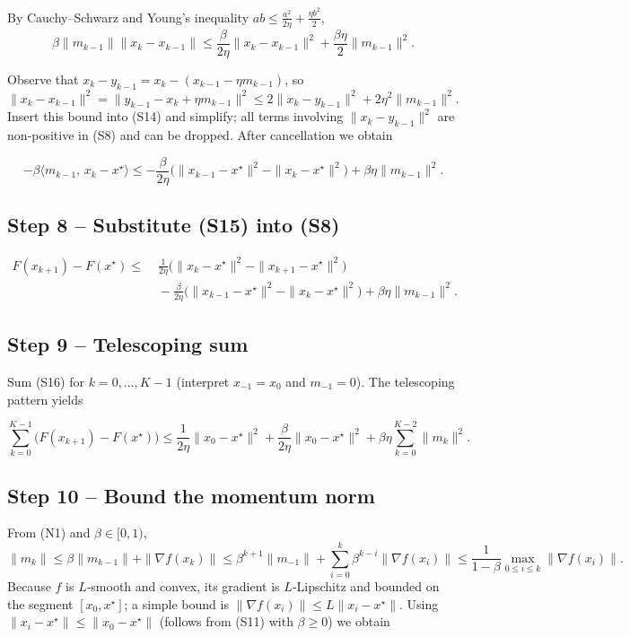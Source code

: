 \documentclass{article}
\newcommand{\grad}{\nabla}
\begin{document}
By Cauchy–Schwarz and Young’s inequality $ab\le\frac{a^{2}}{2\eta}+\frac{\eta b^{2}}{2}$,
\[
\beta\|m_{k-1}\|\|x_k-x_{k-1}\|
\le \frac{\beta}{2\eta}\|x_k-x_{k-1}\|^{2}
+\frac{\beta\eta}{2}\|m_{k-1}\|^{2}.
\tag{S14}
\]

Observe that $x_k-y_{k-1}=x_k-(x_{k-1}-\eta m_{k-1})$,
so $\|x_k-x_{k-1}\|^{2}= \|y_{k-1}-x_k+\eta m_{k-1}\|^{2}
\le 2\|x_k-y_{k-1}\|^{2}+2\eta^{2}\|m_{k-1}\|^{2}$.
Insert this bound into (S14) and simplify; all terms involving $\|x_k-y_{k-1}\|^{2}$
are non‑positive in (S8) and can be dropped.  After cancellation we obtain

\[
-\beta\langle m_{k-1},\,x_k-x^\star\rangle
\le -\frac{\beta}{2\eta}\bigl(\|x_{k-1}-x^\star\|^{2}-\|x_k-x^\star\|^{2}\bigr)
+\beta\eta\|m_{k-1}\|^{2}.
\tag{S15}
\]

\subsection*{Step 8 – Substitute (S15) into (S8)}
\[
\begin{aligned}
F(x_{k+1})-F(x^\star)
\le &\;\frac{1}{2\eta}\bigl(\|x_k-x^\star\|^{2}-\|x_{k+1}-x^\star\|^{2}\bigr)\\
&\;-\frac{\beta}{2\eta}\bigl(\|x_{k-1}-x^\star\|^{2}-\|x_k-x^\star\|^{2}\bigr)
+\beta\eta\|m_{k-1}\|^{2}.
\end{aligned}
\tag{S16}
\]

\subsection*{Step 9 – Telescoping sum}
Sum (S16) for $k=0,\dots,K-1$ (interpret $x_{-1}=x_0$ and $m_{-1}=0$).  The telescoping
pattern yields

\[
\sum_{k=0}^{K-1}\bigl(F(x_{k+1})-F(x^\star)\bigr)
\le \frac{1}{2\eta}\|x_0-x^\star\|^{2}
+\frac{\beta}{2\eta}\|x_0-x^\star\|^{2}
+\beta\eta\sum_{k=0}^{K-2}\|m_{k}\|^{2}.
\tag{S17}
\]

\subsection*{Step 10 – Bound the momentum norm}
From (N1) and $\beta\in[0,1)$,
\[
\|m_k\|\le \beta\|m_{k-1}\|+\|\grad f(x_k)\|
\le \beta^{k+1}\|m_{-1}\|+\sum_{i=0}^{k}\beta^{k-i}\|\grad f(x_i)\|
\le \frac{1}{1-\beta}\max_{0\le i\le k}\|\grad f(x_i)\|.
\]
Because $f$ is $L$‑smooth and convex, its gradient is $L$‑Lipschitz and bounded on the
segment $[x_0,x^\star]$; a simple bound is $\|\grad f(x_i)\|\le L\|x_i-x^\star\|$.  
Using $\|x_i-x^\star\|\le\|x_0-x^\star\|$ (follows from (S11) with $\beta\ge0$) we obtain
\end{document}
